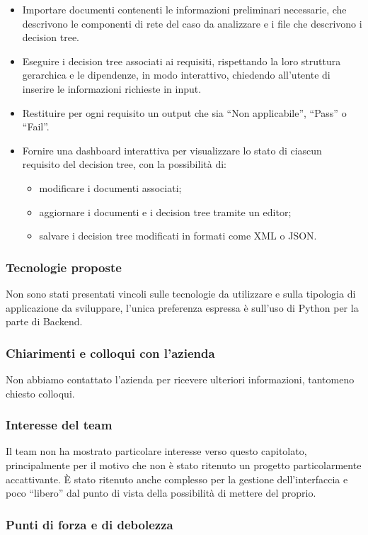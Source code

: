 \documentclass[a4paper,11pt]{article}
\begin{document}
\begin{itemize}[leftmargin=*]
    \item Importare documenti contenenti le informazioni preliminari necessarie, che descrivono le componenti di rete del caso da analizzare e i file che descrivono i decision tree.
    \item Eseguire i decision tree associati ai requisiti, rispettando la loro struttura gerarchica e le dipendenze, in modo interattivo, chiedendo all'utente di inserire le informazioni richieste in input.
    \item Restituire per ogni requisito un output che sia ``Non applicabile'', ``Pass'' o ``Fail''.
    \item Fornire una dashboard interattiva per visualizzare lo stato di ciascun requisito del decision tree, con la possibilità di:
    \begin{itemize}[leftmargin=*]
        \item modificare i documenti associati;  
        \item aggiornare i documenti e i decision tree tramite un editor;  
        \item salvare i decision tree modificati in formati come XML o JSON.
    \end{itemize}
\end{itemize}
\subsubsection{Tecnologie proposte}
Non sono stati presentati vincoli sulle tecnologie da utilizzare e sulla tipologia di applicazione da sviluppare, l'unica preferenza espressa è sull'uso di Python per la parte di Backend.
\subsubsection{Chiarimenti e colloqui con l'azienda}
Non abbiamo contattato l'azienda per ricevere ulteriori informazioni, tantomeno chiesto colloqui.
\subsubsection{Interesse del team}
Il team non ha mostrato particolare interesse verso questo capitolato, principalmente per il motivo che non è stato ritenuto un progetto particolarmente accattivante. È stato ritenuto anche complesso per la gestione dell'interfaccia e poco “libero” dal punto di vista della possibilità di mettere del proprio.
\newpage
\subsubsection{Punti di forza e di debolezza}
\end{document}
